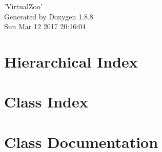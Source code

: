 \documentclass[twoside]{book}
\newcommand{\+}{\discretionary{\mbox{\scriptsize$\hookleftarrow$}}{}{}}
\newcommand{\clearemptydoublepage}{%
  \newpage{\pagestyle{empty}\cleardoublepage}%
}
\begin{document}
\hypersetup{pageanchor=false,
             bookmarks=true,
             bookmarksnumbered=true,
             pdfencoding=unicode
            }
\begin{titlepage}
\vspace*{7cm}
\begin{center}%
{\Large 'Virtual\+Zoo' }\\
\vspace*{1cm}
{\large Generated by Doxygen 1.8.8}\\
\vspace*{0.5cm}
{\small Sun Mar 12 2017 20:16:04}\\
\end{center}
\end{titlepage}
\clearemptydoublepage
\tableofcontents
\clearemptydoublepage
{}
\hypersetup{pageanchor=true}

\chapter{Hierarchical Index}

\chapter{Class Index}

\chapter{Class Documentation}























































\newpage
{}
{}
\printindex
\end{document}
